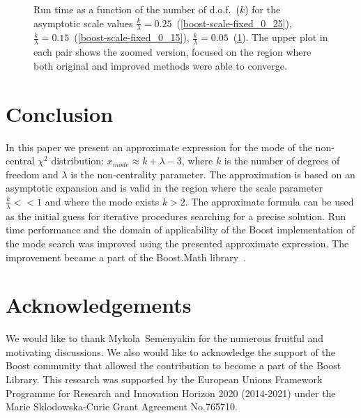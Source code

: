 \documentclass{amsart}
\numberwithin{equation}{section}
\begin{document}
\begin{figure}[t]
\begin{subfigure}[t]{0.3\textwidth}
		\caption{}\label{boost-scale-fixed_0_05}
	\end{subfigure}
    \caption{Run time as a function of the number of d.o.f.\ ($k$) for the asymptotic scale values $\frac{k}{\lambda}=0.25$~(\ref{boost-scale-fixed_0_25}), $\frac{k}{\lambda}=0.15$~(\ref{boost-scale-fixed_0_15}), $\frac{k}{\lambda}=0.05$~(\ref{boost-scale-fixed_0_05}). The upper plot in each pair shows the zoomed version, focused on the region where both original and improved methods were able to converge.}\label{fig:boost-scale-fixed}
\end{figure}

\section{Conclusion}
In this paper we present an approximate expression for the mode of the non-central $\chi^2$ distribution: $x_{mode} \approx k + \lambda - 3$, where $k$ is the number of degrees of freedom and $\lambda$ is the non-centrality parameter. The approximation is based on an asymptotic expansion and is valid in the region where the scale parameter $\frac{k}{\lambda} << 1$ and where the mode exists $k > 2$. The approximate formula can be used as the initial guess for iterative procedures searching for a precise solution. Run time performance and the domain of applicability of the Boost implementation of the mode search was improved using the presented approximate expression. The improvement became a part of the Boost.Math library~\cite{gbench-script}.

\section{Acknowledgements}
We would like to thank Mykola~Semenyakin for the numerous fruitful and motivating discussions. We also would like to acknowledge the support of the Boost community that allowed the contribution to become a part of the Boost Library. This research was supported by the European Unions Framework Programme for Research and Innovation Horizon 2020 (2014-2021) under the Marie Sklodowska-Curie Grant Agreement No.765710.
\end{document}
